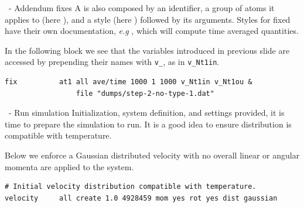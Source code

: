 \begin{frame}[fragile]{\secname}{\subsecname\ - Addendum fixes}
A  is also composed by an identifier, a group of atoms it applies to (here ), and a style (here ) followed by its arguments. Styles for fixed have their own documentation, \emph{e.g} \href{https://docs.lammps.org/fix_ave_time.html}{}, which will compute time averaged quantities.

\vspace{0.5cm}

In the following block we see that the variables introduced in previous slide are accessed by prepending their names with \Verb|v_|, as in \Verb|v_Nt1in|.

\vspace{0.5cm}

\begin{lstlisting}[language=LAMMPS,basicstyle=\small]
fix          at1 all ave/time 1000 1 1000 v_Nt1in v_Nt1ou &
                 file "dumps/step-2-no-type-1.dat"
\end{lstlisting}
\end{frame}

\begin{frame}[fragile]{\secname}{\subsecname\ - Run simulation}
Initialization, system definition, and settings provided, it is time to prepare the simulation to run. It is a good idea to ensure  distribution is compatible with temperature.

\vspace{0.5cm}

Below we enforce a Gaussian distributed velocity with no overall linear or angular momenta are applied to the system.
\vspace{0.5cm}

\begin{lstlisting}[language=LAMMPS,basicstyle=\small]
# Initial velocity distribution compatible with temperature.
velocity     all create 1.0 4928459 mom yes rot yes dist gaussian
\end{lstlisting}
\end{frame}

